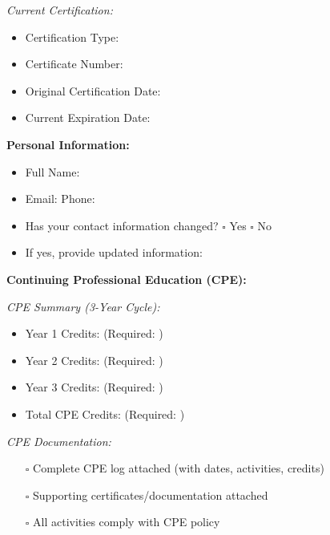 \documentclass[11pt,a4paper]{article}
\begin{document}
\textit{Current Certification:}
\begin{itemize}
\item Certification Type: \underline{\hspace{8cm}}
\item Certificate Number: \underline{\hspace{8cm}}
\item Original Certification Date: \underline{\hspace{4cm}}
\item Current Expiration Date: \underline{\hspace{4cm}}
\end{itemize}

\textbf{Personal Information:}
\begin{itemize}
\item Full Name: \underline{\hspace{10cm}}
\item Email: \underline{\hspace{8cm}} Phone: \underline{\hspace{5cm}}
\item Has your contact information changed? $\square$ Yes $\square$ No
\item If yes, provide updated information: \underline{\hspace{8cm}}
\end{itemize}

\textbf{Continuing Professional Education (CPE):}

\textit{CPE Summary (3-Year Cycle):}
\begin{itemize}
\item Year 1 Credits: \underline{\hspace{3cm}} (Required: \underline{\hspace{2cm}})
\item Year 2 Credits: \underline{\hspace{3cm}} (Required: \underline{\hspace{2cm}})
\item Year 3 Credits: \underline{\hspace{3cm}} (Required: \underline{\hspace{2cm}})
\item Total CPE Credits: \underline{\hspace{3cm}} (Required: \underline{\hspace{2cm}})
\end{itemize}

\textit{CPE Documentation:}
\begin{itemize}
\item[$\square$] Complete CPE log attached (with dates, activities, credits)
\item[$\square$] Supporting certificates/documentation attached
\item[$\square$] All activities comply with CPE policy
\end{itemize}
\end{document}
